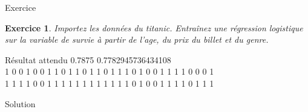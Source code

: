 \documentclass[11pt]{beamer}
\newtheorem{exercice}{Exercice}
\newcommand{\Pythonsmall}[1]{
	{\scriptsize }
}
\begin{document}
\begin{frame}{Exercice}
\begin{exercice}
Importez les données du titanic. Entraînez une régression logistique sur la variable de survie à partir de l'age, du prix du billet et du genre.
\end{exercice}
\end{frame}

\begin{frame}{Résultat attendu}
0.7875 0.7782945736434108\\
\vspace{0.2cm}
1 0 0 1 0 0 1 1 0 1 1 0 1 1 0 1 1 1 0 1 0 0 1 1 1 1 0 0 0 1\\
1 1 1 1 0 0 1 1 1 1 1 1 1 1 1 1 1 1 0 1 0 0 1 1 1 1 0 1 1 1

\end{frame}

\begin{frame}{Solution}
\Pythonsmall{ex510}
\end{frame}
\end{document}
